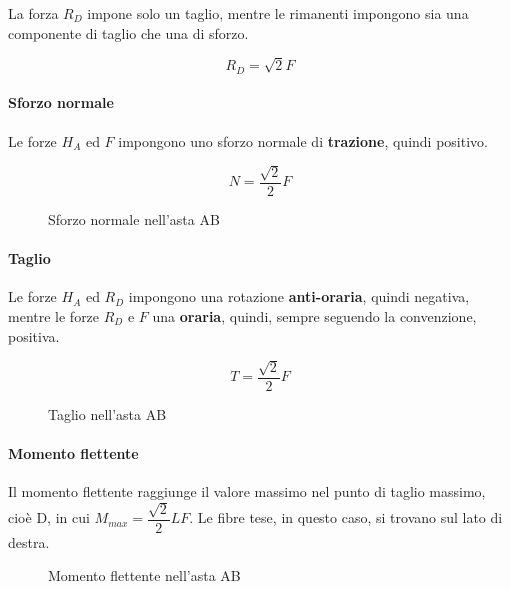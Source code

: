 \documentclass[main.tex]{subfiles}
\begin{document}
La forza $R_D$ impone solo un taglio, mentre le rimanenti impongono sia una componente di taglio che una di sforzo.

\[
R_D = \sqrt{2}F
\]

\paragraph{Sforzo normale}
Le forze $H_A$ ed $F$ impongono uno sforzo normale di \textbf{trazione}, quindi positivo.

\[
N = \dfrac{\sqrt{2}}{2}F
\]

\begin{figure}[H]
\centering
\resizebox{.5\textwidth}{!}{}
\caption{Sforzo normale nell'asta AB}
\end{figure}

\paragraph{Taglio}
Le forze $H_A$ ed $R_D$ impongono una rotazione \textbf{anti-oraria}, quindi negativa, mentre le forze $R_D$ e $F$ una \textbf{oraria}, quindi, sempre seguendo la convenzione, positiva.

\[
T = \dfrac{\sqrt{2}}{2}F
\]

\begin{figure}[H]
\centering
\resizebox{.5\textwidth}{!}{}
\caption{Taglio nell'asta AB}
\end{figure}

\paragraph{Momento flettente}
Il momento flettente raggiunge il valore massimo nel punto di taglio massimo, cioè D, in cui $M_{max} = \dfrac{\sqrt{2}}{2}LF$. Le fibre tese, in questo caso, si trovano sul lato di destra.

\begin{figure}[H]
\centering
\resizebox{.5\textwidth}{!}{}
\caption{Momento flettente nell'asta AB}
\end{figure}
\end{document}
